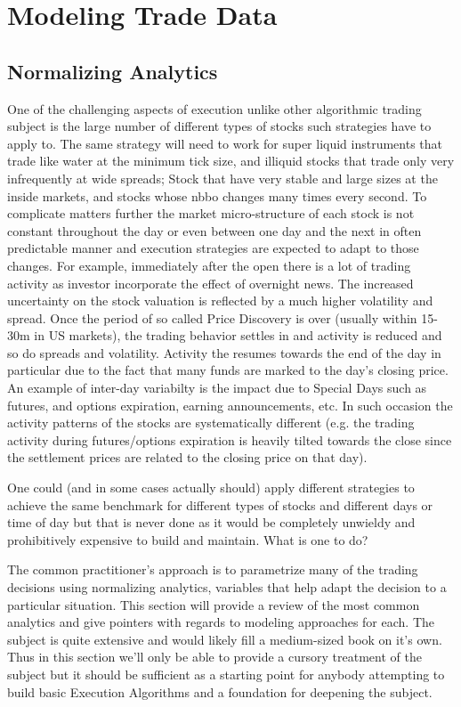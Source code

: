 
\chapter{Modeling Trade Data}
\section{Normalizing Analytics}
One of the challenging aspects of execution unlike other algorithmic trading subject is the large number of different types of stocks such strategies have to apply to. The same strategy will need to work for super liquid instruments that trade like water at the minimum tick size, and illiquid stocks that trade only very infrequently at wide spreads; Stock that have very stable and large sizes at the inside markets, and stocks whose nbbo changes many times every second. To complicate matters further the market micro-structure of each stock is not constant throughout the day or even between one day and the next in often predictable manner and execution strategies are expected to adapt to those changes. For example, immediately after the open there is a lot of trading activity as investor incorporate the effect of overnight news. The increased uncertainty on the stock valuation is reflected by a much higher volatility and spread. Once the period of so called Price Discovery is over (usually within 15-30m in US markets), the trading behavior settles in and activity is reduced and so do spreads and volatility. Activity the resumes towards the end of the day in particular due to the  fact that many funds are marked to the day's closing price. An example of inter-day variabilty is the impact due to Special Days such as futures, and options expiration, earning announcements, etc. In such occasion the activity patterns of the stocks are systematically different (e.g. the trading activity during futures/options expiration is heavily tilted towards the close since the settlement prices are related to the closing price on that day).

One could (and in some cases actually should) apply different strategies to achieve the same benchmark for different types of stocks and different days or time of day but that is never done as it would be completely unwieldy and prohibitively expensive to build and maintain. What is one to do?

The common practitioner's approach is to parametrize many of the trading decisions using normalizing analytics, variables that help adapt the decision to a particular situation. This section will provide a review of the most common analytics and give pointers with regards to modeling approaches for each. The subject is quite extensive and would likely fill a medium-sized book on it's own. Thus in this section we'll only be able to provide a cursory treatment of the subject but it should be sufficient as a starting point for anybody attempting to build basic Execution Algorithms and a foundation for deepening the subject.
